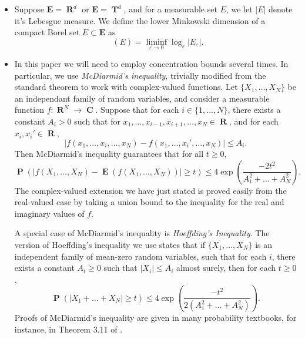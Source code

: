 \documentclass[12pt,reqno]{article}
\numberwithin{equation}{section}
\DeclareMathOperator{\lowminkdim}{\underline{\dim}_{\mathbf{M}}}
\DeclareMathOperator{\RR}{\mathbf{R}}
\DeclareMathOperator{\TT}{\mathbf{T}}
\DeclareMathOperator{\CC}{\mathbf{C}}
\DeclareMathOperator{\EE}{\mathbf{E}}
\DeclareMathOperator{\PP}{\mathbf{P}}
\newcommand{\psitwo}[1]{\| {#1} \|_{\psi_2(L)}}
\begin{document}
\begin{itemize}
    \item Suppose $\mathbf{E} = \RR^d$ or $\mathbf{E} = \TT^d$, and for a measurable set $E$, we let $|E|$ denote it's Lebesgue measure. We define the lower Minkowski dimension of a compact Borel set $E \subset \mathbf{E}$ as
    \[ \lowminkdim(E) = \liminf_{\varepsilon \to 0} \log_\varepsilon|E_\varepsilon|. \]

    \item In this paper we will need to employ concentration bounds several times. In particular, we use \emph{McDiarmid's inequality}, trivially modified from the standard theorem to work with complex-valued functions. Let $\{ X_1, \dots, X_N \}$ be an independant family of random variables, and consider a measurable function $f: \RR^N \to \CC$. Suppose that for each $i \in \{ 1, \dots, N \}$, there exists a constant $A_i > 0$ such that for $x_1, \dots, x_{i-1}, x_{i+1}, \dots, x_N \in \RR$, and for each $x_i, x_i' \in \RR$,
    \[ |f(x_1, \dots, x_i, \dots, x_N) - f(x_1, \dots, x_i', \dots, x_N)| \leq A_i. \]
    Then McDiarmid's inequality guarantees that for all $t \geq 0$,
    \[ \PP \left( |f(X_1, \dots, X_N) - \EE(f(X_1, \dots, X_N))| \geq t \right) \leq 4 \exp \left( \frac{-2t^2}{A_1^2 + \dots + A_N^2} \right). \]
    The complex-valued extension we have just stated is proved easily from the real-valued case by taking a union bound to the inequality for the real and imaginary values of $f$.

    A special case of McDiarmid's inequality is \emph{Hoeffding's Inequality}. The version of Hoeffding's inequality we use states that if $\{ X_1, \dots, X_N \}$ is an independent family of mean-zero random variables, such that for each $i$, there exists a constant $A_i \geq 0$ such that $|X_i| \leq A_i$ almost surely, then for each $t \geq 0$,
    \[ \PP \left( |X_1 + \dots + X_N| \geq t \right) \leq 4 \exp \left(\frac{-t^2}{2(A_1^2 + \dots + A_N^2)} \right). \]
    Proofs of McDiarmid's inequality are given in many probability textbooks, for instance, in Theorem 3.11 of \cite{VanHandel}.
    \begin{comment}

    \item Our random construction involves a probabilistic concentration of measure argument. Define a convex function $\psi_2: [0,\infty) \to [0,\infty)$ by setting
    \[ \psi_2(t) = e^{t^2} - 1, \]
    The function $\psi_2$ induces an Orlicz norm on the family of scalar valued random variables over a probability space by setting, for each random variable $X$,
    \[ \psitwo{X} = \inf \left\{ A \in (0,\infty) : \EE(\psi_2(|X|/A)) \leq 1 \right\}. \]
    The family of random variables with $\psitwo{X} < \infty$ are known as \emph{subgaussian random variables}. Here are the important properties of subgaussian random variables which we use in this paper:
    \begin{itemize}
        \item If $\psitwo{X} \leq A$, then for each $t \geq 0$,
        \[ \PP \left( |X| \geq t \right) \leq 10 \exp \left( -t^2/10A^2 \right). \]
        Thus Subgaussian random variables have Gaussian tails.


\end{comment}
\end{itemize}
\end{document}
